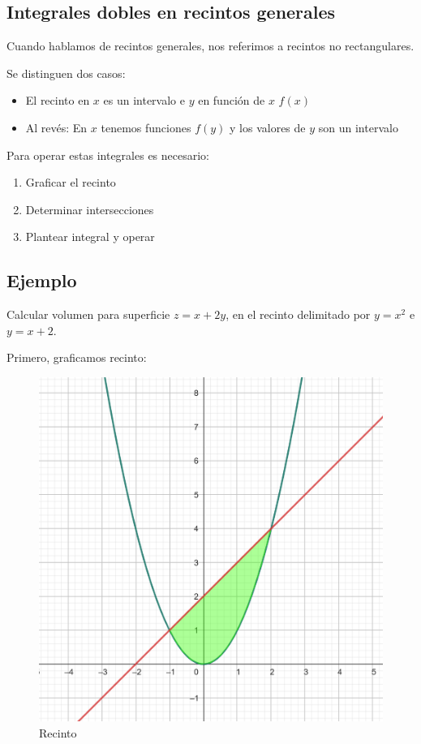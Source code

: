 \subsection{Integrales dobles en recintos generales}

Cuando hablamos de recintos generales,
nos referimos a recintos no rectangulares.

Se distinguen dos casos:
\begin{itemize}
    \item El recinto en \(x\) es un intervalo e \(y\) en función de \(x\) \(f(x)\)
    \item Al revés: En \(x\) tenemos funciones \(f(y)\) y los valores de \(y\) son un intervalo
\end{itemize}

Para operar estas integrales es necesario:

\begin{enumerate}
    \item Graficar el recinto
    \item Determinar intersecciones
    \item Plantear integral y operar
\end{enumerate}

\subsection{Ejemplo}

Calcular volumen para superficie \(z = x + 2y\),
en el recinto delimitado por \(y = x^{2}\) e \(y = x + 2\).

Primero,
graficamos recinto:

\begin{figure}[H]
    \centering
    \includegraphics[scale=.9]{./img/01.png}
    \caption{Recinto}
\end{figure}

